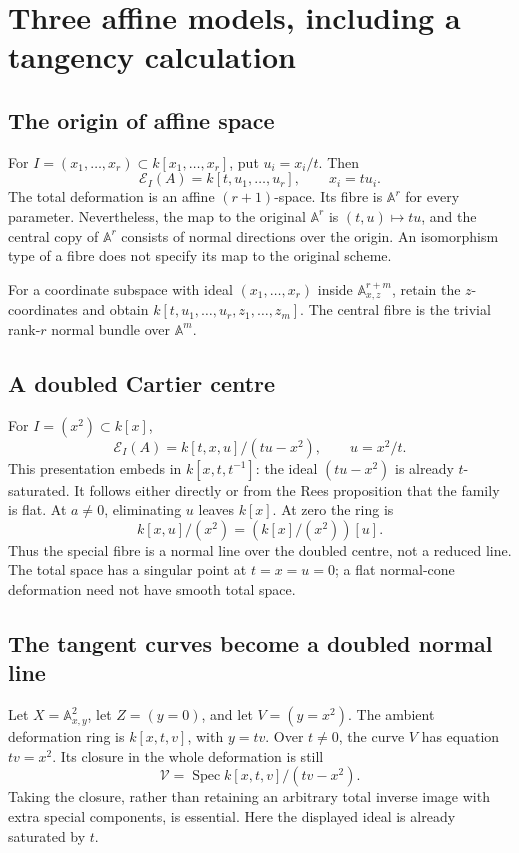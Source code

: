 \documentclass[11pt,a4paper]{article}
\numberwithin{equation}{section}
\theoremstyle{definition}
\newcommand{\A}{\mathbb A}
\newcommand{\Spec}{\operatorname{Spec}}
\begin{document}
\section{Three affine models, including a tangency calculation}
\label{sec:examples}

\subsection{The origin of affine space}
For $I=(x_1,\ldots,x_r)\subset k[x_1,\ldots,x_r]$, put $u_i=x_i/t$.
Then
\[
\mathcal E_I(A)=k[t,u_1,\ldots,u_r],\qquad x_i=tu_i.
\]
The total deformation is an affine $(r+1)$-space. Its fibre is
$\A^r$ for every parameter. Nevertheless, the map to the original
$\A^r$ is $(t,u)\mapsto tu$, and the central copy of $\A^r$ consists
of normal directions over the origin. An isomorphism type of a fibre
does not specify its map to the original scheme.

For a coordinate subspace with ideal $(x_1,\ldots,x_r)$ inside
$\A^{r+m}_{x,z}$, retain the $z$-coordinates and obtain
$k[t,u_1,\ldots,u_r,z_1,\ldots,z_m]$. The central fibre is the trivial
rank-$r$ normal bundle over $\A^m$.

\subsection{A doubled Cartier centre}
For $I=(x^2)\subset k[x]$,
\begin{equation}\label{eq:fat-dnc}
\mathcal E_I(A)=k[t,x,u]/(tu-x^2),\qquad u=x^2/t.
\end{equation}
This presentation embeds in $k[x,t,t^{-1}]$: the ideal $(tu-x^2)$ is
already $t$-saturated. It follows either directly or from the Rees
proposition that the family is flat. At $a\ne0$, eliminating $u$
leaves $k[x]$. At zero the ring is
\[
k[x,u]/(x^2)=(k[x]/(x^2))[u].
\]
Thus the special fibre is a normal line over the doubled centre, not
a reduced line. The total space has a singular point at $t=x=u=0$;
a flat normal-cone deformation need not have smooth total space.

\subsection{The tangent curves become a doubled normal line}
Let $X=\A^2_{x,y}$, let $Z=(y=0)$, and let $V=(y=x^2)$.
The ambient deformation ring is $k[x,t,v]$, with $y=tv$. Over
$t\ne0$, the curve $V$ has equation $tv=x^2$. Its closure in the
whole deformation is still
\begin{equation}\label{eq:tangency-dnc}
\mathcal V=\Spec k[x,t,v]/(tv-x^2).
\end{equation}
Taking the closure, rather than retaining an arbitrary total inverse
image with extra special components, is essential. Here the displayed
ideal is already saturated by $t$.
\end{document}
